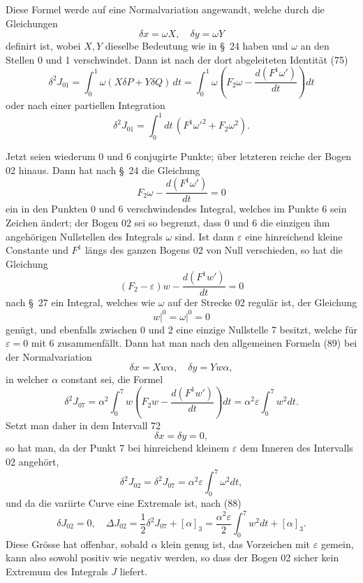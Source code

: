 \documentclass[11pt,a4paper,leqno]{article}
\begin{document}
Diese Formel werde auf eine Normalvariation angewandt, welche durch die Gleichungen
\[
\delta x=\omega X,
\quad
\delta y=\omega Y
\]
definirt ist, wobei $X,Y$ dieselbe Bedeutung wie in \S~24 haben und $\omega$ an den Stellen 0 und 1 verschwindet. Dann ist nach der dort abgeleiteten Identität (75)
\begin{equation}\tag{89}
\delta^2J_{01}=\int_0^1\omega(X\delta P+Y\delta Q)\,dt
=\int_0^1\omega\left(F_2\omega-\frac{d(F^1\omega')}{dt}\right)dt
\end{equation}
oder nach einer partiellen Integration
\begin{equation}\tag{90}
\delta^2J_{01}=\int_0^1dt\,(F^1\omega'^2+F_2\omega^2).
\end{equation}

Jetzt seien wiederum 0 und 6 conjugirte Punkte; über letzteren reiche der Bogen 02 hinaus. Dann hat nach \S~24 die Gleichung
\begin{equation}\tag{91}
F_2\omega-\frac{d(F^1\omega')}{dt}=0
\end{equation}
ein in den Punkten 0 und 6 verschwindendes Integral, welches im Punkte 6 sein Zeichen ändert; der Bogen 02 sei so begrenzt, dass 0 und 6 die einzigen ihm angehörigen Nullstellen des Integrals $\omega$ sind. Ist dann $\varepsilon$ eine hinreichend kleine Constante und $F^1$ längs des ganzen Bogens 02 von Null verschieden, so hat die Gleichung
\[
(F_2-\varepsilon)w-\frac{d(F^1w')}{dt}=0
\]
nach \S~27 ein Integral, welches wie $\omega$ auf der Strecke 02 regulär ist, der Gleichung
\[
\left.w\right|^0=\left.\omega\right|^0=0
\]
genügt, und ebenfalls zwischen 0 und 2 eine einzige Nullstelle 7 besitzt, welche für $\varepsilon=0$ mit 6 zusammenfällt. Dann hat man nach den allgemeinen Formeln (89) bei der Normalvariation
\[
\delta x=Xw\alpha,
\quad
\delta y=Yw\alpha,
\]
in welcher $\alpha$ constant sei, die Formel
\[
\delta^2J_{07}=\alpha^2\int_0^7 w\left(F_2w-\frac{d(F^1w')}{dt}\right)dt
=\alpha^2\varepsilon\int_0^7w^2dt.
\]
Setzt man daher in dem Intervall 72
\[
\delta x=\delta y=0,
\]
so hat man, da der Punkt 7 bei hinreichend kleinem $\varepsilon$ dem Inneren des Intervalls 02 angehört,
\[
\delta^2J_{02}=\delta^2J_{07}=\alpha^2\varepsilon\int_0^7\omega^2dt,
\]
und da die variirte Curve eine Extremale ist, nach (88)
\[
\delta J_{02}=0,
\quad
\Delta J_{02}=\frac12\delta^2J_{07}+[\alpha]_3
=\frac{\alpha^2\varepsilon}{2}\int_0^7w^2dt+[\alpha]_3.
\]
Diese Grösse hat offenbar, sobald $\alpha$ klein genug ist, das Vorzeichen mit $\varepsilon$ gemein, kann also sowohl positiv wie negativ werden, so dass der Bogen 02 sicher kein Extremum des Integrals $J$ liefert.
\end{document}
